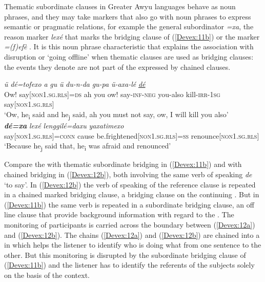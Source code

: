 \documentclass[output=paper]{LSP/langsci}
\begin{document}
Thematic subordinate clauses in Greater Awyu languages behave as noun phrases, and they may take markers that also go with noun phrases to  express semantic or pragmatic relations, for example the general subordinator \textit{=xa}, the  reason marker \textit{lexé} that marks the bridging clause of (\ref{Devex:11b}) or the  marker \textit{=(f)efè} . It is this noun phrase characteristic that explains the association with disruption or `going offline' when thematic clauses are used as bridging clauses: the events they denote are not part of the  expressed by chained clauses.

\begin{exe}
\ex \label{Devex:11ab}
\begin{xlist}
\ex \label{Devex:11a}		
\gll \textit{ü} \textit{dé=tofexo} \textit{a} \textit{gu} \textit{ü}	\textit{du-n-da} \textit{gu-pa} \textit{ü-axa-lé} \underline{\textit{dé}}\\
Ow!	say\textsc{[non1.sg.rls]=ds} ah you ow! say-\textsc{inf-neg} you-also kill-\textsc{irr-1sg} say\textsc{[non1.sg.rls]}\\
\glt `Ow, he\textsubscript{i} said and he\textsubscript{j} said, ah you must not say, ow, I will kill you also'\\

\ex \label{Devex:11b}		
\gll \textbf{\textit{dé=xa}} \textit{lexé} \textit{lenggilé=daxu} \textit{yaxatimexo}\\
say\textsc{[non1.sg.rls}]=\textsc{conn} cause be.frightened[\textsc{non1.sg.rls}]=\textsc{ss} renounce[\textsc{non1.sg.rls}]\\
\glt `Because he\textsubscript{j} said that, he\textsubscript{i} was afraid and renounced'\\
\end{xlist}
\end{exe}

Compare the  with thematic subordinate bridging in (\ref{Devex:11b}) and with chained bridging in (\ref{Devex:12b}), both involving the same verb of speaking \textit{de} `to say'. In (\ref{Devex:12b}) the verb of speaking of the reference clause is repeated in a chained  marked bridging clause, a bridging clause on the continuing . But in (\ref{Devex:11b}) the same verb is repeated in a subordinate bridging clause, an off line clause that provide background information with regard to the . The  monitoring of participants is carried across the boundary between (\ref{Devex:12a}) and (\ref{Devex:12b}). The chains (\ref{Devex:12a}) and (\ref{Devex:12b}) are chained into a  in which  helps the listener to identify who is doing what from one sentence to the other. But this  monitoring is disrupted by the subordinate bridging clause of (\ref{Devex:11b}) and the listener has to identify the referents of the subjects solely on the basis of the context. 
\end{document}
